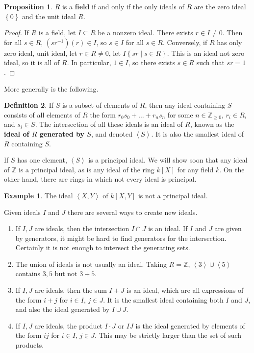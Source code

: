 \documentclass{article}
\newcommand{\Z}{\mathbb{Z}}
\newcommand{\rb}[1]{\left( #1 \right)}
\renewcommand{\sb}[1]{\left[ #1 \right]}
\newcommand{\cb}[1]{\left\{ #1 \right\}}
\newcommand{\ab}[1]{\left\langle #1 \right\rangle}
\theoremstyle{definition}\newtheorem{definition}{Definition}[subsection]
\theoremstyle{definition}\newtheorem{remark}[definition]{Remark}
\theoremstyle{definition}\newtheorem*{example}{Example}
\theoremstyle{definition}\newtheorem*{note}{Note}
\newtheorem{proposition}[definition]{Proposition}
\begin{document}
\begin{proposition}
$ R $ is a \textbf{field} if and only if the only ideals of $ R $ are the zero ideal $ \cb{0} $ and the unit ideal $ R $.
\end{proposition}

\begin{proof}
If $ R $ is a field, let $ I \subseteq R $ be a nonzero ideal. There exists $ r \in I \ne  0 $. Then for all $ s \in R $, $ \rb{sr^{-1}}\rb{r} \in I $, so $ s \in I $ for all $ s \in R $. Conversely, if $ R $ has only zero ideal, unit ideal, let $ r \in R \ne 0 $, let $ I \cb{sr \mid s \in R} $. This is an ideal not zero ideal, so it is all of $ R $. In particular, $ 1 \in I $, so there exists $ s \in R $ such that $ sr = 1 $.
\end{proof}

More generally is the following.

\begin{definition}
If $ S $ is a subset of elements of $ R $, then any ideal containing $ S $ consists of all elements of $ R $ the form $ r_0s_0 + \dots + r_ns_n $ for some $ n \in \Z_{\ge 0} $, $ r_i \in R $, and $ s_i \in S $. The intersection of all these ideals is an ideal of $ R $, known as the \textbf{ideal of $ R $ generated by $ S $}, and denoted $ \ab{S} $. It is also the smallest ideal of $ R $ containing $ S $.
\end{definition}

If $ S $ has one element, $ \ab{S} $ is a principal ideal. We will show soon that any ideal of $ \Z $ is a principal ideal, as is any ideal of the ring $ k\sb{X} $ for any field $ k $. On the other hand, there are rings in which not every ideal is principal.

\begin{example}
The ideal $ \ab{X, Y} $ of $ k\sb{X, Y} $ is not a principal ideal.
\end{example}

Given ideals $ I $ and $ J $ there are several ways to create new ideals.
\begin{enumerate}
\item If $ I, J $ are ideals, then the intersection $ I \cap J $ is an ideal. If $ I $ and $ J $ are given by generators, it might be hard to find generators for the intersection. Certainly it is not enough to intersect the generating sets.
\item The union of ideals is not usually an ideal. Taking $ R = \Z $, $ \ab{3} \cup \ab{5} $ contains $ 3, 5 $ but not $ 3 + 5 $.
\item If $ I, J $ are ideals, then the sum $ I + J $ is an ideal, which are all expressions of the form $ i + j $ for $ i \in I $, $ j \in J $. It is the smallest ideal containing both $ I $ and $ J $, and also the ideal generated by $ I \cup J $.
\item If $ I, J $ are ideals, the product $ I \cdot J $ or $ IJ $ is the ideal generated by elements of the form $ ij $ for $ i \in I $, $ j \in J $. This may be strictly larger than the set of such products.
\end{enumerate}
\end{document}
